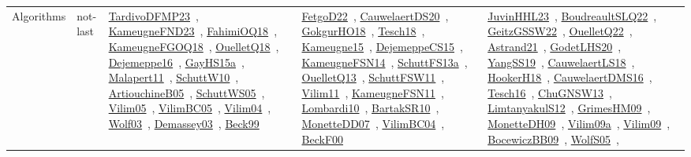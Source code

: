 {\begin{longtable}{lp{3cm}>{\raggedright\arraybackslash}p{6cm}>{\raggedright\arraybackslash}p{6cm}>{\raggedright\arraybackslash}p{8cm}}
Algorithms & not-last & \href{works/TardivoDFMP23.pdf}{TardivoDFMP23}~\cite{TardivoDFMP23}, \href{works/KameugneFND23.pdf}{KameugneFND23}~\cite{KameugneFND23}, \href{works/FahimiOQ18.pdf}{FahimiOQ18}~\cite{FahimiOQ18}, \href{works/KameugneFGOQ18.pdf}{KameugneFGOQ18}~\cite{KameugneFGOQ18}, \href{works/OuelletQ18.pdf}{OuelletQ18}~\cite{OuelletQ18}, \href{works/Dejemeppe16.pdf}{Dejemeppe16}~\cite{Dejemeppe16}, \href{works/GayHS15a.pdf}{GayHS15a}~\cite{GayHS15a}, \href{works/Malapert11.pdf}{Malapert11}~\cite{Malapert11}, \href{works/SchuttW10.pdf}{SchuttW10}~\cite{SchuttW10}, \href{works/ArtiouchineB05.pdf}{ArtiouchineB05}~\cite{ArtiouchineB05}, \href{works/SchuttWS05.pdf}{SchuttWS05}~\cite{SchuttWS05}, \href{works/Vilim05.pdf}{Vilim05}~\cite{Vilim05}, \href{works/VilimBC05.pdf}{VilimBC05}~\cite{VilimBC05}, \href{works/Vilim04.pdf}{Vilim04}~\cite{Vilim04}, \href{works/Wolf03.pdf}{Wolf03}~\cite{Wolf03}, \href{works/Demassey03.pdf}{Demassey03}~\cite{Demassey03}, \href{works/Beck99.pdf}{Beck99}~\cite{Beck99} & \href{works/FetgoD22.pdf}{FetgoD22}~\cite{FetgoD22}, \href{works/CauwelaertDS20.pdf}{CauwelaertDS20}~\cite{CauwelaertDS20}, \href{works/GokgurHO18.pdf}{GokgurHO18}~\cite{GokgurHO18}, \href{works/Tesch18.pdf}{Tesch18}~\cite{Tesch18}, \href{works/Kameugne15.pdf}{Kameugne15}~\cite{Kameugne15}, \href{works/DejemeppeCS15.pdf}{DejemeppeCS15}~\cite{DejemeppeCS15}, \href{works/KameugneFSN14.pdf}{KameugneFSN14}~\cite{KameugneFSN14}, \href{works/SchuttFS13a.pdf}{SchuttFS13a}~\cite{SchuttFS13a}, \href{works/OuelletQ13.pdf}{OuelletQ13}~\cite{OuelletQ13}, \href{works/SchuttFSW11.pdf}{SchuttFSW11}~\cite{SchuttFSW11}, \href{works/Vilim11.pdf}{Vilim11}~\cite{Vilim11}, \href{works/KameugneFSN11.pdf}{KameugneFSN11}~\cite{KameugneFSN11}, \href{works/Lombardi10.pdf}{Lombardi10}~\cite{Lombardi10}, \href{works/BartakSR10.pdf}{BartakSR10}~\cite{BartakSR10}, \href{works/MonetteDD07.pdf}{MonetteDD07}~\cite{MonetteDD07}, \href{works/VilimBC04.pdf}{VilimBC04}~\cite{VilimBC04}, \href{works/BeckF00.pdf}{BeckF00}~\cite{BeckF00} & \href{works/JuvinHHL23.pdf}{JuvinHHL23}~\cite{JuvinHHL23}, \href{works/BoudreaultSLQ22.pdf}{BoudreaultSLQ22}~\cite{BoudreaultSLQ22}, \href{works/GeitzGSSW22.pdf}{GeitzGSSW22}~\cite{GeitzGSSW22}, \href{works/OuelletQ22.pdf}{OuelletQ22}~\cite{OuelletQ22}, \href{works/Astrand21.pdf}{Astrand21}~\cite{Astrand21}, \href{works/GodetLHS20.pdf}{GodetLHS20}~\cite{GodetLHS20}, \href{works/YangSS19.pdf}{YangSS19}~\cite{YangSS19}, \href{works/CauwelaertLS18.pdf}{CauwelaertLS18}~\cite{CauwelaertLS18}, \href{works/HookerH18.pdf}{HookerH18}~\cite{HookerH18}, \href{works/CauwelaertDMS16.pdf}{CauwelaertDMS16}~\cite{CauwelaertDMS16}, \href{works/Tesch16.pdf}{Tesch16}~\cite{Tesch16}, \href{works/ChuGNSW13.pdf}{ChuGNSW13}~\cite{ChuGNSW13}, \href{works/LimtanyakulS12.pdf}{LimtanyakulS12}~\cite{LimtanyakulS12}, \href{works/GrimesHM09.pdf}{GrimesHM09}~\cite{GrimesHM09}, \href{works/MonetteDH09.pdf}{MonetteDH09}~\cite{MonetteDH09}, \href{works/Vilim09a.pdf}{Vilim09a}~\cite{Vilim09a}, \href{works/Vilim09.pdf}{Vilim09}~\cite{Vilim09}, \href{works/BocewiczBB09.pdf}{BocewiczBB09}~\cite{BocewiczBB09}, \href{works/WolfS05.pdf}{WolfS05}~\cite{WolfS05}, 
\end{longtable}}
